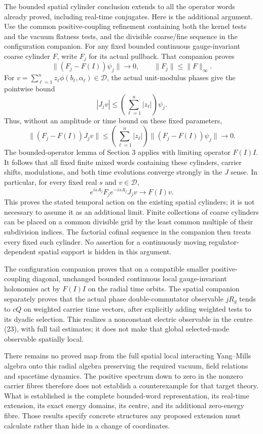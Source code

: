 \documentclass[
  11pt,
]{article}
\begin{document}
The bounded spatial cylinder conclusion extends to all the operator
words already proved, including real-time conjugates. Here is the
additional argument. Use the common positive-coupling refinement
containing both the kernel tests and the vacuum flatness tests, and the
divisible coarse/fine sequence in the configuration companion. For any
fixed bounded continuous gauge-invariant coarse cylinder \(F\), write
\(F_j\) for its actual pullback. That companion proves \[
 \|(F_j-F(I))\psi_j\|\longrightarrow0,\qquad
 \|F_j\|\le\|F\|_\infty.
 \tag{26}
\] For
\(v=\sum_{\ell=1}^n z_\ell\phi(b_\ell,\alpha_\ell)\in\mathcal D\), the
actual unit-modulus phases give the pointwise bound \[
 |J_jv|\le\left(\sum_{\ell=1}^n|z_\ell|\right)\psi_j.
\] Thus, without an amplitude or time bound on these fixed parameters,
\[
 \|(F_j-F(I))J_jv\|
 \le\left(\sum_{\ell=1}^n|z_\ell|\right)
          \|(F_j-F(I))\psi_j\|\longrightarrow0.
 \tag{27}
\] The bounded-operator lemma of Section 3 applies with limiting
operator \(F(I)I\). It follows that all fixed finite mixed words
containing these cylinders, carrier shifts, modulations, and both time
evolutions converge strongly in the \(J\) sense. In particular, for
every fixed real \(s\) and \(v\in\mathcal D\), \[
 e^{isA_j}F_j e^{-isA_j}J_jv
       \longrightarrow F(I)v.
 \tag{28}
\] This proves the stated temporal action on the existing spatial
cylinders; it is not necessary to assume it as an additional limit.
Finite collections of coarse cylinders can be placed on a common
divisible grid by the least common multiple of their subdivision
indices. The factorial cofinal sequence in the companion then treats
every fixed such cylinder. No assertion for a continuously moving
regulator-dependent spatial support is hidden in this argument.

The configuration companion proves that on a compatible smaller
positive-coupling diagonal, unchanged bounded continuous local
gauge-invariant holonomies act by \(F(I)I\) on the radial time orbits.
The spatial companion separately proves that the actual phase
double-commutator observable \(jR_g\) tends to \(cQ\) on weighted
carrier time vectors, after explicitly adding weighted tests to its
dyadic selection. This realizes a nonconstant electric observable in the
centre (23), with full tail estimates; it does not make that global
selected-mode observable spatially local.

There remains no proved map from the full spatial local interacting
Yang--Mills algebra onto this radial algebra preserving the required
vacuum, field relations and spacetime dynamics. The positive spectrum
down to zero in the nonzero carrier fibres therefore does not establish
a counterexample for that target theory. What is established is the
complete bounded-word representation, its real-time extension, its exact
energy domains, its centre, and its additional zero-energy fibre. Those
results specify concrete structures any proposed extension must
calculate rather than hide in a change of coordinates.
\end{document}
